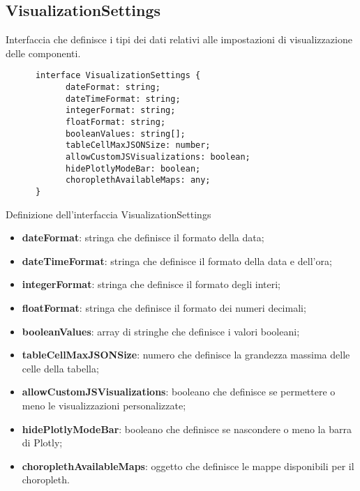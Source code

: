 \subsection{VisualizationSettings}
Interfaccia che definisce i tipi dei dati relativi alle impostazioni di visualizzazione delle componenti.
\begin{listing}[H]
      \begin{verbatim}
      interface VisualizationSettings {
            dateFormat: string;
            dateTimeFormat: string;
            integerFormat: string;
            floatFormat: string;
            booleanValues: string[];
            tableCellMaxJSONSize: number;
            allowCustomJSVisualizations: boolean;
            hidePlotlyModeBar: boolean;
            choroplethAvailableMaps: any;
      }
      \end{verbatim}
      \caption{Definizione dell'interfaccia VisualizationSettings}
      \label{listing:visualizationSettings}
\end{listing}
\begin{itemize}
      \item \textbf{dateFormat}: stringa che definisce il formato della data;
      \item \textbf{dateTimeFormat}: stringa che definisce il formato della data e dell'ora;
      \item \textbf{integerFormat}: stringa che definisce il formato degli interi;
      \item \textbf{floatFormat}: stringa che definisce il formato dei numeri decimali;
      \item \textbf{booleanValues}: array di stringhe che definisce i valori booleani;
      \item \textbf{tableCellMaxJSONSize}: numero che definisce la grandezza massima delle celle della tabella;
      \item \textbf{allowCustomJSVisualizations}: booleano che definisce se permettere o meno le visualizzazioni personalizzate;
      \item \textbf{hidePlotlyModeBar}: booleano che definisce se nascondere o meno la barra di Plotly;
      \item \textbf{choroplethAvailableMaps}: oggetto che definisce le mappe disponibili per il choropleth.
\end{itemize}


